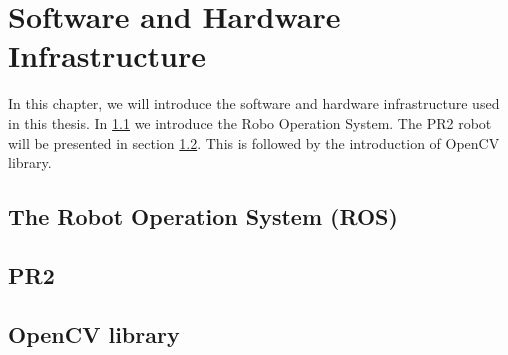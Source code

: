 \chapter{Software and Hardware Infrastructure}
\label{chapter:SHI}
In this chapter, we will introduce the software and hardware
infrastructure used in this thesis. In \ref{sec:ros} we introduce the
Robo Operation System. The PR2 robot will be presented in section
\ref{sec:pr2}. This is followed by the introduction of OpenCV library.

\section{The Robot Operation System (ROS)}
\label{sec:ros}



\section{PR2}
\label{sec:pr2}

\section{OpenCV library}
\label{sec:opencv}




